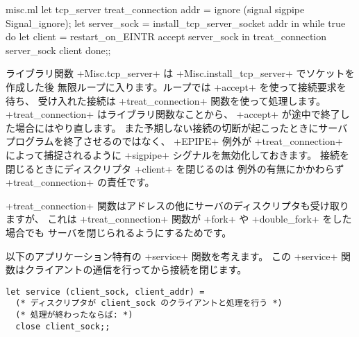 \begin{listingcodefile}{misc.ml}
let tcp_server treat_connection addr =
  ignore (signal sigpipe Signal_ignore);
  let server_sock = install_tcp_server_socket addr in
  while true do
      let client = restart_on_EINTR accept server_sock in
      treat_connection server_sock client
  done;;
\end{listingcodefile}
ライブラリ関数 \ml+Misc.tcp_server+ は \ml+Misc.install_tcp_server+ でソケットを作成した後
無限ループに入ります。ループでは \ml+accept+ を使って接続要求を待ち、
受け入れた接続は \ml+treat_connection+ 関数を使って処理します。
\ml+treat_connection+ はライブラリ関数なことから、
\ml+accept+ が途中で終了した場合にはやり直します。
また予期しない接続の切断が起こったときにサーバプログラムを終了させるのではなく、
\ml+EPIPE+ 例外が \ml+treat_connection+ によって捕捉されるように
\ml+sigpipe+ シグナルを無効化しておきます。
接続を閉じるときにディスクリプタ \ml+client+ を閉じるのは
例外の有無にかかわらず \ml+treat_connection+ の責任です。

\ml+treat_connection+ 関数はアドレスの他にサーバのディスクリプタも受け取りますが、
これは \ml+treat_connection+ 関数が \ml+fork+ や \ml+double_fork+ をした場合でも
サーバを閉じられるようにするためです。

以下のアプリケーション特有の \ml+service+ 関数を考えます。
この \ml+service+ 関数はクライアントの通信を行ってから接続を閉じます。
%
\begin{lstlisting}
let service (client_sock, client_addr) =
  (* ディスクリプタが client_sock のクライアントと処理を行う *)
  (* 処理が終わったならば: *)
  close client_sock;;
\end{lstlisting}
%

